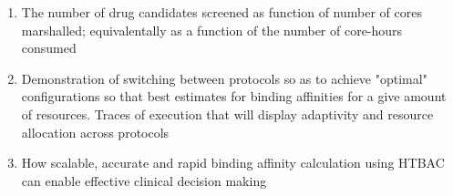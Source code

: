 \documentclass[conference]{IEEEtran}
\begin{document}
\begin{enumerate}

\item The number of drug candidates screened as function of number of cores marshalled; equivalentally as a function of the number of core-hours consumed

\item Demonstration of switching between protocols so as to achieve "optimal"
configurations so that best estimates for binding affinities for a give amount
of resources. Traces of execution that will display adaptivity and resource
allocation across protocols

\item How scalable, accurate and rapid binding affinity calculation using
HTBAC can enable effective clinical decision making


\end{enumerate}


\end{document}
